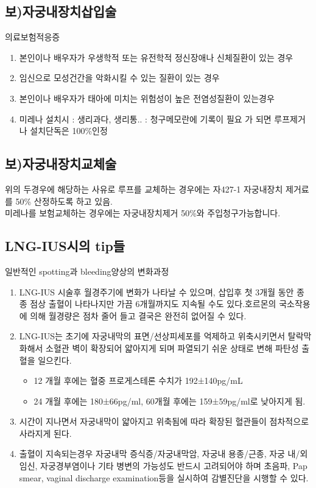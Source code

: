 \subsection{보)자궁내장치삽입술}
의료보험적응증 
\begin{enumerate}[1)]\tightlist
\item 본인이나 배우자가 우생학적 또는 유전학적 정신장애나 신체질환이 있는 경우
\item 임신으로 모성건간을 악화시킬 수 있는 질환이 있는 경우
\item 본인이나 배우자가 태아에 미치는 위험성이 높은 전염성질환이 있는경우
\item 미레나 설치시 : 생리과다, 생리통.. : 청구메모란에 기록이 필요 가 되면 루프제거나 설치단독은 100\%인정
\end{enumerate}

\subsection{보)자궁내장치교체술}
위의 두경우에 해당하는 사유로 루프를 교체하는 경우에는 자427-1 자궁내장치 제거료를 50\% 산정하도록 하고 있음.\\
미레나를 보험교체하는 경우에는 자궁내장치제거 50\%와 주입청구가능합니다.

\subsection{LNG-IUS시의 tip들}
일반적인 spotting과 bleeding양상의 변화과정
\begin{enumerate}\tightlist
\item LNG-IUS 시술후 월경주기에 변화가 나타날 수 있으며, 삽입후 첫 3개월 동안 종종 점상 출혈이 나타나지만 가끔 6개월까지도 지속될 수도 있다.호르몬의 국소작용에 의해 월경량은 점차 줄어 들고 결국은 완전히 없어질 수 있다.
\item LNG-IUS는 초기에 자궁내막의 표면/선상피세포를 억제하고 위축시키면서 탈락막화해서 소혈관 벽이 확장되어 얇아지게 되며 파열되기 쉬운 상태로 변해 파탄성 출혈을 일으킨다.
	\begin{itemize}\tightlist
	\item 12 개월 후에는 혈중 프로게스테론 수치가 192±140pg/mL
	\item 24 개월 후에는 180±66pg/ml, 60개월 후에는 159±59pg/ml로 낮아지게 됨.
	\end{itemize}
\item 시간이 지나면서 자궁내막이 얇아지고 위축됨에 따라 확장된 혈관들이 점차적으로 사라지게 된다.
\item 출혈이 지속되는경우 자궁내막 증식증/자궁내막암, 자궁내 용종/근종, 자궁 내/외 임신, 자궁경부염이나 기타 병변의 가능성도 반드시 고려되어야 하며 초음파, Pap smear, vaginal discharge examination등을 실시하여 감별진단을 시행할 수 있다.	
\end{enumerate}

